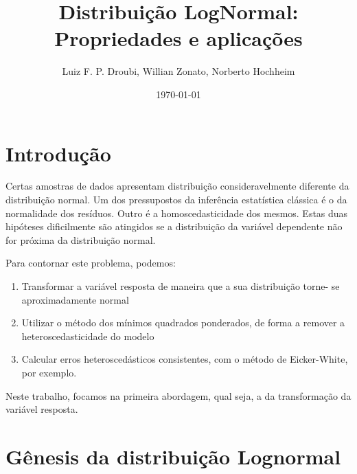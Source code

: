 \documentclass[final, xcolor={table}]{beamer}
\title
[13\textsuperscript{\underline{o}} Congresso Brasileiro de Cadastro Técnico 
Multifinalitário e Gestão Territorial, 21 - 24 / OUT / 2018] %
{ %
Distribuição LogNormal:\\ 
Propriedades e aplicações
}
\author{ %
Luiz F. P. Droubi\inst{1}, Willian Zonato\inst{1}, Norberto Hochheim\inst{2}
}
\institute
[Universidade Federal de Santa Catarina] %
{
\inst{1} SPU/SC, Florianópolis/SC\\[0.3ex]
\inst{2} Universidade Federal de Santa Catarina, Florianópolis/SC\\
}
\date{\today}
\begin{document}
\begin{frame}[t]
\begin{multicols}{3}

\section{Introdução}

Certas amostras de dados apresentam distribuição consideravelmente diferente da
distribuição normal. Um dos pressupostos da inferência estatística clássica é o 
da normalidade dos resíduos. Outro é a homoscedasticidade dos mesmos. Estas
duas hipóteses dificilmente são atingidos se a distribuição da variável
dependente não for próxima da distribuição normal.

Para contornar este problema, podemos:

\begin{enumerate}
  \item Transformar a variável resposta de maneira que a sua distribuição torne-
se aproximadamente normal
  \item Utilizar o método dos mínimos quadrados ponderados, de forma a remover a
heteroscedasticidade do modelo
  \item Calcular erros heteroscedásticos consistentes, com o método de 
  Eicker-White, por exemplo.
\end{enumerate}

Neste trabalho, focamos na primeira abordagem, qual seja, a da transformação da
variável resposta.

\section{Gênesis da distribuição Lognormal}


\end{multicols}
\end{frame}
\end{document}
